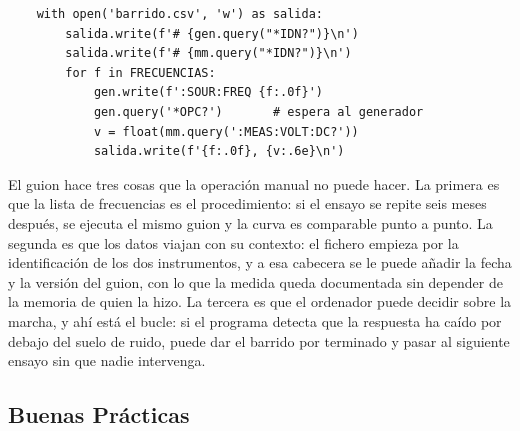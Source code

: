 \begin{listing}
\small
\begin{verbatim}
    with open('barrido.csv', 'w') as salida:
        salida.write(f'# {gen.query("*IDN?")}\n')
        salida.write(f'# {mm.query("*IDN?")}\n')
        for f in FRECUENCIAS:
            gen.write(f':SOUR:FREQ {f:.0f}')
            gen.query('*OPC?')       # espera al generador
            v = float(mm.query(':MEAS:VOLT:DC?'))
            salida.write(f'{f:.0f}, {v:.6e}\n')
\end{verbatim}
\caption[Bucle de medida del barrido y registro de los datos.]{Bucle de medida, continuación del guion anterior dentro de los dos bloques \texttt{with}. Cada punto se escribe en el fichero junto con la identificación de los dos instrumentos, de modo que el registro de datos quede ligado a los aparatos que lo produjeron.}\label{lst:pyvisa_bucle}
\end{listing}

El guion hace tres cosas que la operación manual no puede hacer. La primera es que la lista de frecuencias es el procedimiento: si el ensayo se repite seis meses después, se ejecuta el mismo guion y la curva es comparable punto a punto. La segunda es que los datos viajan con su contexto: el fichero empieza por la identificación de los dos instrumentos, y a esa cabecera se le puede añadir la fecha y la versión del guion, con lo que la medida queda documentada sin depender de la memoria de quien la hizo. La tercera es que el ordenador puede decidir sobre la marcha, y ahí está el bucle: si el programa detecta que la respuesta ha caído por debajo del suelo de ruido, puede dar el barrido por terminado y pasar al siguiente ensayo sin que nadie intervenga.


\subsection{Buenas Prácticas}\label{sub:buenas_practicas}

